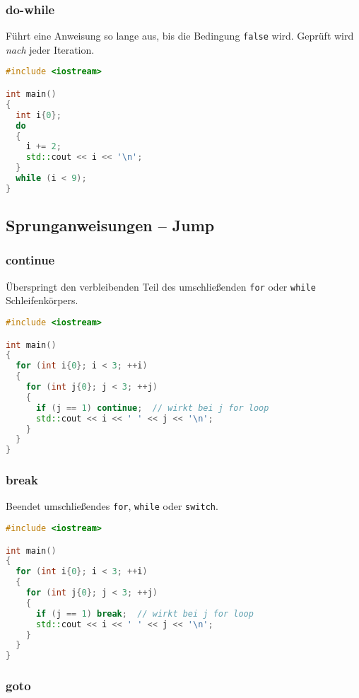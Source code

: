 \documentclass[10pt,twocolumn]{scrartcl}
\begin{document}
\subsubsection{do-while}

Führt eine Anweisung so lange aus, bis die Bedingung \lstinline|false| wird.
Geprüft wird \emph{nach} jeder Iteration.

\begin{lstlisting}[language=C++]
#include <iostream>

int main()
{
  int i{0};
  do
  {
    i += 2;
    std::cout << i << '\n';
  }
  while (i < 9);
}
\end{lstlisting}

\subsection{Sprunganweisungen -- Jump}
\subsubsection{continue}

Überspringt den verbleibenden Teil des umschließenden \lstinline|for| oder
\lstinline|while| Schleifenkörpers.

\begin{lstlisting}[language=C++]
#include <iostream>

int main()
{
  for (int i{0}; i < 3; ++i)
  {
    for (int j{0}; j < 3; ++j)
    {
      if (j == 1) continue;  // wirkt bei j for loop
      std::cout << i << ' ' << j << '\n';
    }
  }
}
\end{lstlisting}

\subsubsection{break}

Beendet umschließendes \lstinline|for|, \lstinline|while| oder
\lstinline|switch|.

\begin{lstlisting}[language=C++]
  #include <iostream>

int main()
{
  for (int i{0}; i < 3; ++i)
  {
    for (int j{0}; j < 3; ++j)
    {
      if (j == 1) break;  // wirkt bei j for loop
      std::cout << i << ' ' << j << '\n';
    }
  }
}
\end{lstlisting}

\subsubsection{goto}
\end{document}

